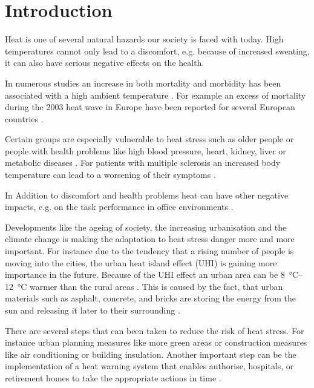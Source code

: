 
\section{Introduction}

Heat is one of several natural hazards our society is faced with today. High temperatures cannot only lead to a discomfort, e.g. because of increased sweating, it can also have serious negative effects on the health. 

In numerous studies an increase in both mortality and
morbidity has been associated with a high ambient temperature \parencite{Zacharias2014,Basu2009}. For example an excess of mortality during the 2003 heat wave in Europe have been reported for several European countries \parencite{Johnson2005,Kovats2004}. 

Certain groups are especially vulnerable to heat stress such as older people or people with health problems like high blood pressure,  heart, kidney, liver or
metabolic diseases  \parencite{Ebi2004,Huebler2007}. For patients with multiple sclerosis an increased body temperature can lead to a worsening of their symptoms \parencite{Guthrie1995,Davis2010}.

In Addition to discomfort and health problems heat can have other negative impacts, e.g. on the task performance in office environments \parencite{Seppaenen2006}. 

Developments like the ageing of society, the increasing urbanisation and the climate change is making the adaptation to heat stress danger more and more important. For instance due to the tendency that a rising number of people is moving into the cities, the urban heat island effect (UHI) is gaining more importance in the future. Because of the UHI effect an urban area can be  \SIrange{8}{12}{\celsius} warmer than the rural areas \parencite{Prashad2014}. This is caused by the fact, that urban materials such as asphalt, concrete, and bricks are storing the energy from the sun and releasing it later to their surrounding \parencite{Prashad2014}. 

There are several steps that can been taken to reduce the risk of heat stress. For instance urban planning measures like more green areas or construction measures like air conditioning or building insulation. Another important step can be the implementation of a heat warning system that enables authorise, hospitals, or retirement homes to take the appropriate actions in time \parencite{Ebi2004}.

